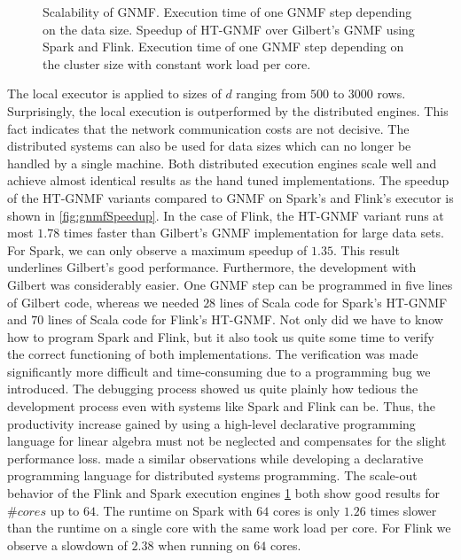 \begin{figure}[!h]
\begin{subfigure}{\dualpgfwidth}
		\caption{}
		\label{fig:nmfNodesRuntime}
	\end{subfigure}
	\caption{Scalability of GNMF.  Execution time of one GNMF step depending on the data size.  Speedup of HT-GNMF over Gilbert's GNMF using Spark and Flink.  Execution time of one GNMF step depending on the cluster size with constant work load per core.}
	\label{fig:nmfBenchmark}
\end{figure}

The local executor is applied to sizes of $d$ ranging from $500$ to $3000$ rows.
Surprisingly, the local execution is outperformed by the distributed engines.
This fact indicates that the network communication costs are not decisive.
The distributed systems can also be used for data sizes which can no longer be handled by a single machine.
Both distributed execution engines scale well and achieve almost identical results as the hand tuned implementations.
The speedup of the HT-GNMF variants compared to GNMF on Spark's and Flink's executor is shown in \cref{fig:gnmfSpeedup}.
In the case of Flink, the HT-GNMF variant runs at most $1.78$ times faster than Gilbert's GNMF implementation for large data sets.
For Spark, we can only observe a maximum speedup of $1.35$.
This result underlines Gilbert's good performance.
Furthermore, the development with Gilbert was considerably easier.
One GNMF step can be programmed in five lines of Gilbert code, whereas we needed $28$ lines of Scala code for Spark's HT-GNMF and $70$ lines of Scala code for Flink's HT-GNMF.
Not only did we have to know how to program Spark and Flink, but it also took us quite some time to verify the correct functioning of both implementations.
The verification was made significantly more difficult and time-consuming due to a programming bug we introduced.
The debugging process showed us quite plainly how tedious the development process even with systems like Spark and Flink can be.
Thus, the productivity increase gained by using a high-level declarative programming language for linear algebra must not be neglected and compensates for the slight performance loss.
\cite{alvaro:2010a} made a similar observations while developing a declarative programming language for distributed systems programming.
The scale-out behavior of the Flink and Spark execution engines \cref{fig:nmfNodesRuntime} both show good results for $\#cores$ up to $64$.
The runtime on Spark with $64$ cores is only $1.26$ times slower than the runtime on a single core with the same work load per core.
For Flink we observe a slowdown of $2.38$ when running on $64$ cores.

